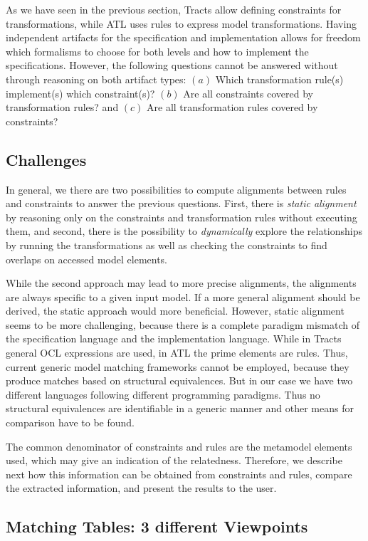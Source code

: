As we have seen in the previous section, Tracts allow defining constraints for transformations, while ATL uses rules to express model transformations. Having independent artifacts for the specification and implementation allows for freedom which formalisms to choose for both levels and how to implement the specifications. However, the following questions cannot be answered without through reasoning on both artifact types: $(a)$  Which transformation rule(s) implement(s) which constraint(s)? $(b)$ Are all constraints covered by transformation rules? and $(c)$ Are all transformation rules covered by constraints?

\subsection{Challenges}

In general, we there are two possibilities to compute alignments between rules and constraints to answer the previous questions. First, there is \emph{static alignment} by reasoning only on the constraints and transformation rules without executing them, and second, there is the possibility to \emph{dynamically} explore the relationships by running the transformations as well as checking the constraints to find overlaps on accessed model elements.

While the second approach may lead to more precise alignments, the alignments are always specific to a given input model. If a more general alignment should be derived, the static approach would more beneficial. However, static alignment seems to be more challenging, because there is a complete paradigm mismatch of the specification language and the implementation language. While in Tracts general OCL expressions are used, in ATL the prime elements are rules. Thus, current generic model matching frameworks cannot be employed, because they produce matches based on structural equivalences. But in our case we have two different languages following different programming paradigms. Thus no structural equivalences are identifiable in a generic manner and other means for comparison have to be found.

The common denominator of constraints and rules are the metamodel elements used, which may give an indication of the relatedness. Therefore, we describe next how this information can be obtained from constraints and rules, compare the extracted information, and present the results to the user.

\subsection{Matching Tables: 3 different Viewpoints}
\label{subsec:MatchingTables}

